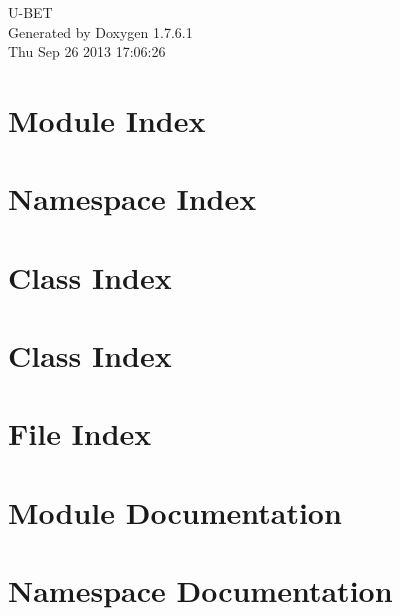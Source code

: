 \documentclass[a4paper]{book}
\begin{document}
\hypersetup{pageanchor=false,citecolor=blue}
\begin{titlepage}
\vspace*{7cm}
\begin{center}
{\Large \-U-\/\-B\-E\-T }\\
\vspace*{1cm}
{\large \-Generated by Doxygen 1.7.6.1}\\
\vspace*{0.5cm}
{\small Thu Sep 26 2013 17:06:26}\\
\end{center}
\end{titlepage}
\clearemptydoublepage
{}
\tableofcontents
\clearemptydoublepage
{}
\hypersetup{pageanchor=true,citecolor=blue}
\chapter{\-Module \-Index}

\chapter{\-Namespace \-Index}

\chapter{\-Class \-Index}

\chapter{\-Class \-Index}

\chapter{\-File \-Index}

\chapter{\-Module \-Documentation}




\chapter{\-Namespace \-Documentation}

\end{document}
